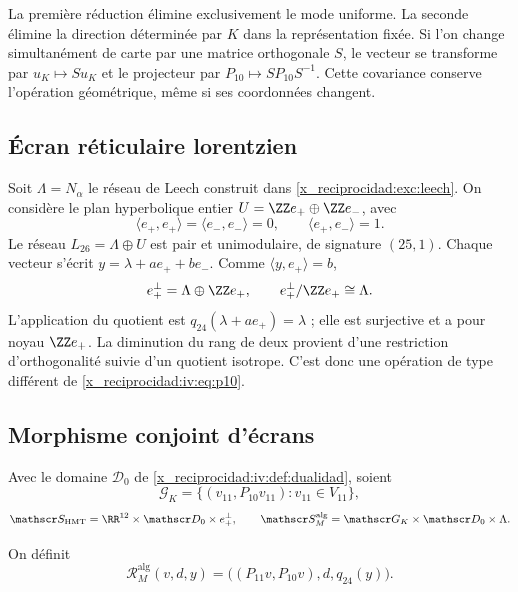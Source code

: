 La première réduction élimine exclusivement le mode uniforme.
La seconde élimine la direction déterminée par \(K\) dans
la représentation fixée. Si l’on change simultanément de carte
par une matrice orthogonale \(S\), le vecteur se transforme par
\(u_K\mapsto Su_K\) et le projecteur par
\(P_{10}\mapsto SP_{10}S^{-1}\). Cette covariance conserve
l’opération géométrique, même si ses coordonnées changent.

\subsection{Écran réticulaire lorentzien}

Soit \(\Lambda=N_\alpha\) le réseau de Leech construit
dans \ref{x_reciprocidad:exc:leech}. On considère le plan hyperbolique entier
\(U=\ZZ e_+\oplus\ZZ e_-\), avec
\[
 \langle e_+,e_+\rangle=\langle e_-,e_-\rangle=0,
 \qquad\langle e_+,e_-\rangle=1.
\]
Le réseau \(L_{26}=\Lambda\oplus U\) est pair et
unimodulaire, de signature \((25,1)\). Chaque vecteur s’écrit
\(y=\lambda+ae_++be_-\). Comme
\(\langle y,e_+\rangle=b\),
\begin{equation}
 e_+^\perp=\Lambda\oplus\ZZ e_+,
 \qquad e_+^\perp/\ZZ e_+\cong\Lambda.
 \label{x_reciprocidad:iv:eq:26-24}
\end{equation}
L’application du quotient est
\(q_{24}(\lambda+ae_+)=\lambda\) ; elle est surjective et a pour
noyau \(\ZZ e_+\). La diminution du rang de deux provient
d’une restriction d’orthogonalité suivie d’un quotient
isotrope. C’est donc une opération de type différent de
\eqref{x_reciprocidad:iv:eq:p10}.

\subsection{Morphisme conjoint d’écrans}

Avec le domaine \(\mathscr D_0\) de \ref{x_reciprocidad:iv:def:dualidad},
soient
\[
 \mathscr G_K=\{(v_{11},P_{10}v_{11}):v_{11}\in V_{11}\},
\]
\[
 \mathscr S_{\mathrm{HMT}}=\RR^{12}\times\mathscr D_0\times e_+^\perp,
 \qquad
 \mathscr S_M^{\mathrm{alg}}=\mathscr G_K\times\mathscr D_0\times\Lambda.
\]
\begin{definition}
\label{x_reciprocidad:iv:def:rm-alg}
On définit
\begin{equation}
 \mathcal R_M^{\mathrm{alg}}(v,d,y)
 =\bigl((P_{11}v,P_{10}v),d,q_{24}(y)\bigr).
 \label{x_reciprocidad:iv:eq:rm-alg}
\end{equation}
\end{definition}

